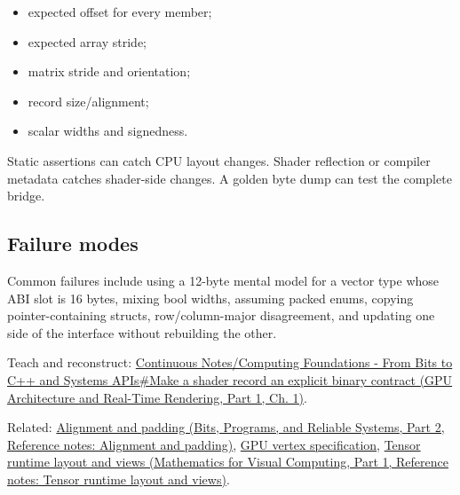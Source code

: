 \begin{itemize}
\tightlist
\item
  expected offset for every member;
\item
  expected array stride;
\item
  matrix stride and orientation;
\item
  record size/alignment;
\item
  scalar widths and signedness.
\end{itemize}

Static assertions can catch CPU layout changes. Shader reflection or compiler metadata catches shader-side changes. A golden byte dump can test the complete bridge.

\subsection{Failure modes}\label{appendix-749048795dbb-failure-modes}

\hypertarget{appendix-749048795dbb-failure-modes}{}

Common failures include using a 12-byte mental model for a vector type whose ABI slot is 16 bytes, mixing bool widths, assuming packed enums, copying pointer-containing structs, row/column-major disagreement, and updating one side of the interface without rebuilding the other.

Teach and reconstruct: \href{../06-GPU-Architecture-and-Real-Time-Rendering-P01/main.pdf\#nameddest=01-foundations-i-ch008-make-a-shader-record-an-explicit-binary-contract}{Continuous Notes/Computing Foundations - From Bits to C++ and Systems APIs\#Make a shader record an explicit binary contract (GPU Architecture and Real-Time Rendering, Part 1, Ch. 1)}.

Related: \href{../01-Bits-Programs-and-Reliable-Systems-P02/main.pdf\#nameddest=appendix-a1f7c53b4742}{Alignment and padding (Bits, Programs, and Reliable Systems, Part 2, Reference notes: Alignment and padding)}, \hyperref[appendix-749ba51a6c25]{GPU vertex specification}, \href{../02-Mathematics-for-Visual-Computing-P01/main.pdf\#nameddest=appendix-cebadf3106d1}{Tensor runtime layout and views (Mathematics for Visual Computing, Part 1, Reference notes: Tensor runtime layout and views)}.
